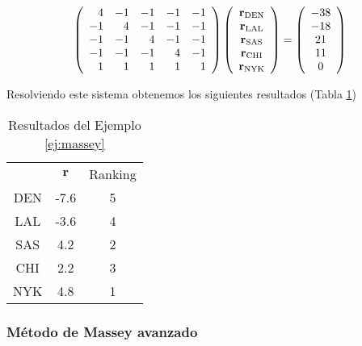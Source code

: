 \begin{ejemplo}
\begin{equation*}
\left(\begin{array}{r r r r r}
4  & -1 & -1 & -1 & -1\\
-1 &  4 & -1 & -1 & -1\\
-1 & -1 &  4 & -1 & -1\\
-1 & -1 & -1 &  4 & -1\\
 1 &  1 &  1 &  1 &  1 
\end{array}\right)
\left(\begin{array}{c}
\mathbf{r}_{\text{DEN}}\\
\mathbf{r}_{\text{LAL}}\\
\mathbf{r}_{\text{SAS}}\\
\mathbf{r}_{\text{CHI}}\\
\mathbf{r}_{\text{NYK}}
\end{array}\right)
=
\left(\begin{array}{c}
-38\\
-18\\
21\\
11\\
0
\end{array}\right)
\end{equation*}

Resolviendo este sistema obtenemos los siguientes resultados (Tabla \ref{tbl:massey_resultados})

\begin{table}[h]
\centering
\caption{Resultados del Ejemplo \ref{ej:massey}}
\label{tbl:massey_resultados}
\begin{tabular}{@{}ccc@{}}
\cmidrule(l){2-3}
    & $\mathbf{r}$ & Ranking \\ \cmidrule(l){2-3} 
DEN & -7.6         & 5       \\ \midrule
LAL & -3.6         & 4       \\ \midrule
SAS & 4.2          & 2       \\ \midrule
CHI & 2.2          & 3       \\ \midrule
NYK & 4.8          & 1       \\ \bottomrule
\end{tabular}
\end{table}
\end{ejemplo}
\subsubsection{Método de Massey avanzado}

